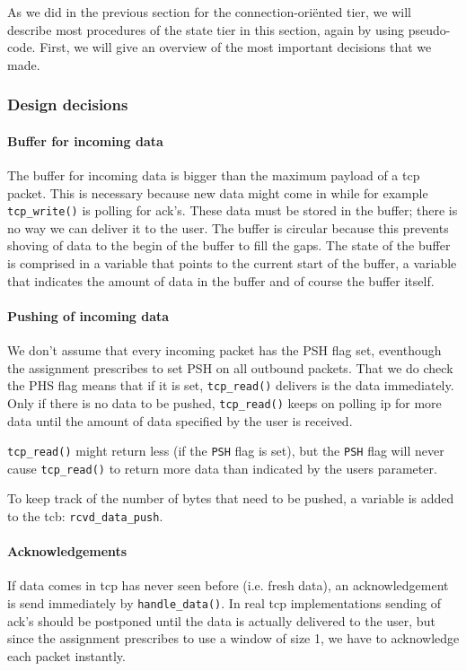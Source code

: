 \documentclass[11pt]{article}
\begin{document}
As we did in the previous section for the connection-ori\"ented tier, we
will describe most procedures of the state tier in this section, again by
using pseudo-code.
First, we will give an overview of the most important decisions that we made.


\subsubsection{Design decisions}


\paragraph{Buffer for incoming data}
    The buffer for incoming data is bigger than the maximum payload of a tcp
    packet. This is necessary because new data might come in while for example 
    \lstinline|tcp_write()| is polling for ack's. These data must be stored in the 
    buffer; 
    there is no way we can deliver it to the user.
    The buffer is circular because this prevents shoving of data to the begin of 
    the buffer to fill the gaps. 
    The state of the buffer is comprised in a variable that points to the 
    current start of the buffer, a variable that indicates the amount of data in 
    the buffer and of course the buffer itself.    

\paragraph{Pushing of incoming data}
    We don't assume that every incoming packet has the PSH flag set, eventhough 
    the assignment prescribes to set PSH on all outbound packets. That we do
    check the PHS flag means 
    that if it is set, \lstinline|tcp_read()| delivers is the data immediately.
    Only if there is no data to be pushed, \lstinline|tcp_read()| keeps on polling 
    ip for 
    more data until the amount of data specified by the user is received.
    
    \lstinline|tcp_read()| might return less (if the \lstinline|PSH| flag is set), but 
    the \lstinline|PSH| flag 
    will never cause \lstinline|tcp_read()| to return more 
    data than indicated by the users parameter.
    
    To keep track of the number of bytes that need to be pushed, a variable is 
    added to the tcb: \lstinline|rcvd_data_push|.

\paragraph{Acknowledgements}
    If data comes in tcp has never seen before (i.e. fresh data), an 
    acknowledgement is send
    immediately by \lstinline|handle_data()|. In real tcp implementations sending of
     ack's 
    should be postponed until the data is actually delivered to the user, 
    but since the assignment prescribes to use a window of size 1, we have to 
    acknowledge each packet instantly.
\end{document}
